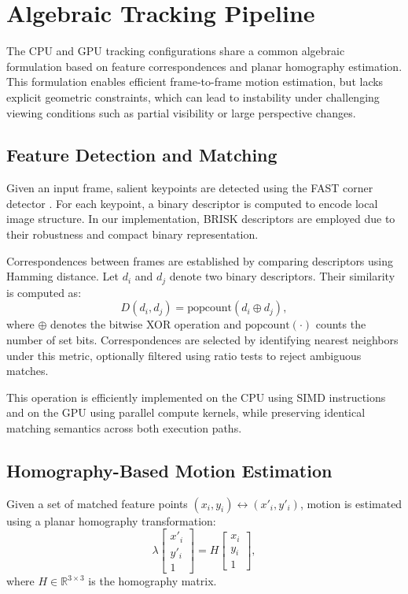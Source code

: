 \section{Algebraic Tracking Pipeline}

The CPU and GPU tracking configurations share a common algebraic formulation based on feature correspondences and planar homography estimation. This formulation enables efficient frame-to-frame motion estimation, but lacks explicit geometric constraints, which can lead to instability under challenging viewing conditions such as partial visibility or large perspective changes.

\subsection{Feature Detection and Matching}

Given an input frame, salient keypoints are detected using the FAST corner detector \cite{rosten2006fast}. For each keypoint, a binary descriptor is computed to encode local image structure. In our implementation, BRISK descriptors \cite{leutenegger2011brisk} are employed due to their robustness and compact binary representation.

Correspondences between frames are established by comparing descriptors using Hamming distance. Let $d_i$ and $d_j$ denote two binary descriptors. Their similarity is computed as:
\[
D(d_i,d_j) = \mathrm{popcount}(d_i \oplus d_j),
\]
where $\oplus$ denotes the bitwise XOR operation and $\mathrm{popcount}(\cdot)$ counts the number of set bits. Correspondences are selected by identifying nearest neighbors under this metric, optionally filtered using ratio tests to reject ambiguous matches.

This operation is efficiently implemented on the CPU using SIMD instructions and on the GPU using parallel compute kernels, while preserving identical matching semantics across both execution paths.

\subsection{Homography-Based Motion Estimation}

Given a set of matched feature points $(x_i, y_i) \leftrightarrow (x'_i, y'_i)$, motion is estimated using a planar homography transformation:
\[
\lambda
\begin{bmatrix}
x'_i \\
y'_i \\
1
\end{bmatrix}
=
H
\begin{bmatrix}
x_i \\
y_i \\
1
\end{bmatrix},
\]
where $H \in \mathbb{R}^{3 \times 3}$ is the homography matrix.

